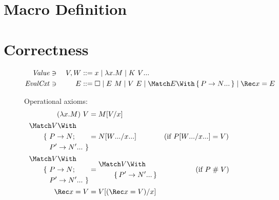 \documentclass[runningheads]{llncs}
\begin{document}
\section{Macro Definition}

\section{Correctness}

\begin{figure}
\centering
  
\begin{alignat*}{2}
  \mathit{Value} &\ni{}& V, W
  &::= x
  \mid \lambda x. M
  \mid K~\many{V}
  \\
  \mathit{EvalCxt} &\ni{}& E
  &::= \hole
  \mid E ~ M
  \mid V ~ E
  \mid \Match E \With \set{\many{P \to N}}
  \mid \Rec x = E
\end{alignat*}

Operational axioms:
\begin{align*}
  (\lambda x. M) ~ V
  &=
  M\subst{x}{V}
  \\
  \begin{aligned}
    &\Match V \With \\
    &\qquad
    \begin{aligned}[t]
    \{~ &P \to N; \\
    &\many{P' \to N'}~\}
    \end{aligned}
  \end{aligned}
  &=
  N\subst{\many{x}}{\many{W}}
  &(\text{if } P\subst{\many{x}}{\many{W}} &= V)
  \\
  \begin{aligned}
    &\Match V \With \\
    &\qquad
    \begin{aligned}[t]
    \{~ &P \to N; \\
    &\many{P' \to N'}~\}
    \end{aligned}
  \end{aligned}
  &=
  \begin{aligned}
    &\Match V \With \\
    &\qquad \set{\many{P' \to N'}}
  \end{aligned}
  &(\text{if } P &\apart V)
  \\
  \Rec x = V
  &=
  V\subst{x}{(\Rec x = V)}
\end{align*}


\end{figure}
\end{document}
